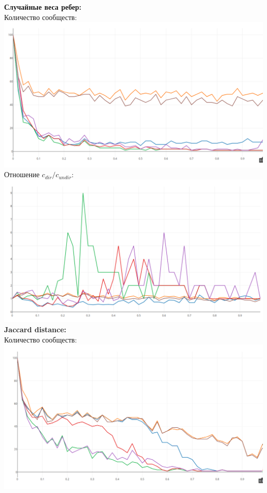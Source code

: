 {\bfseries Случайные веса ребер:} \\
Количество сообществ:\\
\includegraphics[scale=0.32]{pics/random_count.png}\\
Отношение $c_{dir}/c_{undir}$:\\
\includegraphics[scale=0.32]{pics/random_d.png}
\newpage
{\bfseries Jaccard distance:} \\
Количество сообществ:\\
\includegraphics[scale=0.32]{pics/jaccard_count.png}\\
